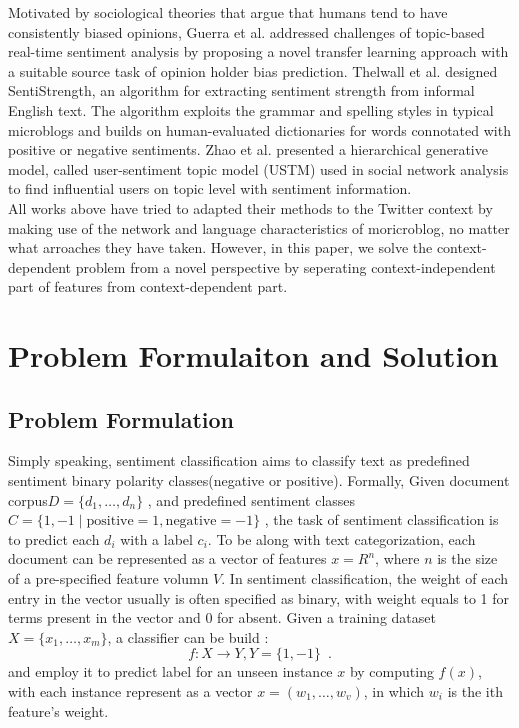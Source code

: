 \documentclass{llncs}
\begin{document}
Motivated by sociological theories that argue that humans tend to have consistently biased opinions, Guerra et al.\cite{CalaisGuerra:2011BOT} addressed challenges of topic-based real-time sentiment analysis by proposing a novel transfer learning approach with a suitable source task of opinion holder bias prediction.
Thelwall et al.\cite{Thelwall:2010SSS,Thelwall:2012SSD} designed SentiStrength, an algorithm for extracting sentiment strength from informal English text. The algorithm exploits the grammar and spelling styles in typical microblogs and builds on human-evaluated dictionaries for words connotated with positive or negative sentiments.
Zhao et al.\cite{Zhao:2012UTM} presented a hierarchical generative model, called user-sentiment topic model (USTM) used in social network analysis to find influential users on topic level with sentiment information.\\
All works above have tried to adapted their methods to the Twitter context by making use of the network and language characteristics of moricroblog, no matter what arroaches they have taken. However, in this paper, we solve the context-dependent problem from a novel perspective by seperating context-independent part of features from context-dependent part.
\section{Problem Formulaiton and Solution}
\label{problem}
\subsection{Problem Formulation}
Simply speaking, sentiment classification aims to classify text as predefined sentiment binary polarity classes(negative or positive).  
Formally, Given document corpus$ D=\lbrace d_{1},\dots ,d_{n} \rbrace$ , and predefined sentiment classes$ C=\lbrace 1,-1\mid\mathrm{positive}=1,\mathrm{negative}=-1 \rbrace$ , the task of sentiment classification is to predict each $ d_{i} $ with a label $ c_{i} $. 
To be along with text categorization, each document can be represented as a vector of features $ x=R^{n} $, where $ n $ is the size of a pre-specified feature volumn $ V $. 
In sentiment classification, the weight of each entry in the vector usually is often specified as binary, with weight equals to 1 for terms present in the vector and 0 for absent. 
Given a training dataset $ X=\lbrace x_{1},\dots,x_{m} \rbrace $, a classifier can be build :
\begin{equation}
  f:X \longrightarrow Y, Y=\lbrace 1,-1 \rbrace \enspace .
\end{equation} 
and employ it to predict label for an unseen instance $ x $ by computing $ f \left( x \right)   $, with each instance represent as a vector $ x=\left( w_{1},\dots,w_{v} \right)  $, in which $ w_{i} $ is the ith feature’s weight.
\end{document}
